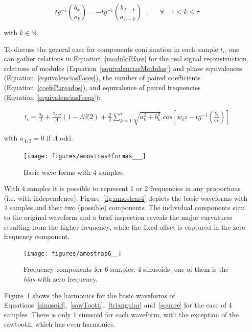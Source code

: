 \begin{equation}\label{equivalenciasFases}
tg^{-1}\left(\frac{b_k}{a_k}\right)=-tg^{-1}\left(\frac{b_{\Lambda -k}}{a_{\Lambda - k}}\right)\;\;,\quad \;\; \forall \quad 1 \leq k \leq \tau
\end{equation}

\noindent with $k \in \mathbb{N}$.

To discuss the general case for components combination in each sample $t_i$, one can gather relations in Equation~\ref{moduloEfase} for the real signal reconstruction, relations of modules (Equation~\ref{equivalenciasModulos}) and phase equivalences (Equation~\ref{equivalenciasFases}), the number of paired coefficients (Equation~\ref{coefsPareados}), and equivalence of paired frequencies (Equation~\ref{equivalenciasFreqs}):

\begin{equation}\label{eq:reconsCompleta}
\begin{split}
	t_i = \frac{a_0}{\Lambda} + \frac{ a_{\Lambda/2}}{\Lambda}(1-\Lambda\% 2) + \frac{2}{\Lambda}\sum_{k=1}^{\tau}\sqrt{a_k^2 + b_k^2} \; cos\left[w_k i - tg^{-1}\left(\frac{b_k}{a_k}\right)\right]
\end{split}
\end{equation}

\noindent with $a_{\Lambda/2}=0$ if $\Lambda$ odd.

\begin{figure}
    \centering
        \texttt{[image: figures/amostras4formas\_\_\_]}
    \caption{Basic wave forms with 4 samples.}
        \label{fig:formas4}
\end{figure}

With 4 samples it is possible to represent 1 or 2 frequencies in any proportions (i.e. with independence). Figure~\ref{fig:amostras4} depicts the basic waveforms with 4 samples and their two (possible) components. The individual components sum to the original waveform and a brief inspection reveals the major curvatures resulting from the higher frequency, while the fixed offset is captured in the zero frequency component.

\begin{figure}
    \centering
        \texttt{[image: figures/amostras6\_\_]}
    \caption{Frequency components for 6 samples: 4 sinusoids, one of them is the \emph{bias} with zero frequency.}
        \label{fig:amostras6}
\end{figure}

Figure~\ref{fig:formas4} shows the harmonics for the basic waveforms of Equations~\ref{sinusoid},~\ref{sawTooth},~\ref{triangular} and~\ref{square} for the case of 4 samples. There is only 1 sinusoid for each waveform, with the exception of the sawtooth, which has even harmonics.

